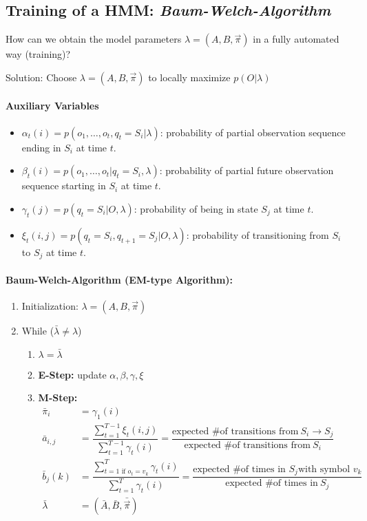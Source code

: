 \subsection*{Training of a HMM: \emph{Baum-Welch-Algorithm}}

How can we obtain the model parameters \(\lambda = (A, B, \vec{\pi})\) in a fully automated way (training)?

Solution: Choose \(\lambda = (A, B, \vec{\pi})\) to locally maximize $p(O|\lambda)$

\paragraph{Auxiliary Variables}
\begin{itemize}
	\item $\alpha_t(i) = p(o_1,\dots, o_t, q_t=S_i|\lambda)$: probability of partial observation sequence ending in $S_i$ at time $t$.
	\item $\beta_t(i) = p(o_1,\dots, o_t | q_t=S_i, \lambda)$: probability of partial future observation sequence starting in $S_i$ at time $t$.
	\item $\gamma_t(j) = p(q_t=S_i|O, \lambda)$: probability of being in state $S_j$ at time $t$.
	\item $\xi_t(i,j) = p(q_t=S_i, q_{t+1}=S_j|O, \lambda)$: probability of transitioning from $S_i$ to $S_j$ at time $t$.
\end{itemize}

\paragraph{Baum-Welch-Algorithm (EM-type Algorithm):}

\begin{enumerate}
    \item Initialization: \(\lambda = (A, B, \vec{\pi})\)
    \item While ($\bar{\lambda} \neq \lambda$) {
		\begin{enumerate}
			\item $\lambda = \bar{\lambda}$
			\item \textbf{E-Step:} update $\alpha, \beta, \gamma, \xi$
			\item \textbf{M-Step:}
			\begin{align*}
				\bar{\pi}_i &= \gamma_1(i) \\
				\bar{a}_{i,j} &= \dfrac{\sum_{t=1}^{T-1} \xi_t(i,j)}{\sum_{t=1}^{T-1} \gamma_t(i)} = \dfrac{\text{expected \# of transitions from} \ S_i \rightarrow S_j}{\text{expected \# of transitions from} \ S_i} \\
				\bar{b}_{j}(k) &= \dfrac{\sum_{t=1 \text{ if } o_t=v_k}^{T} \gamma_t(i)}{\sum_{t=1}^{T} \gamma_t(i)} = \dfrac{\text{expected \# of times in }S_j \text{with symbol }v_k}{\text{expected \# of times in} \ S_j} \\
				\bar{\lambda} &= (\bar{A}, \bar{B}, \bar{\vec{\pi}})
			\end{align*}
		\end{enumerate}
		}
\end{enumerate}



